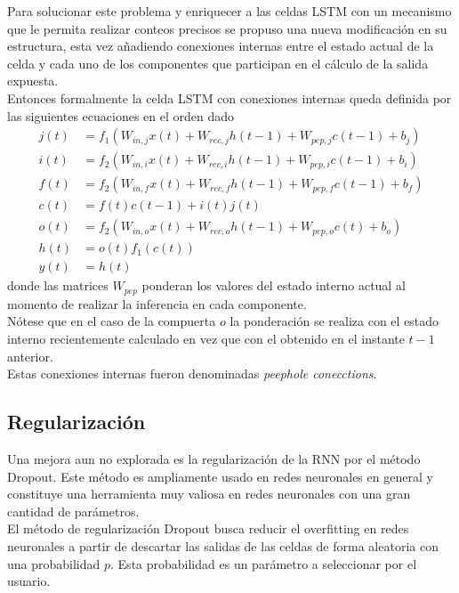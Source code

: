 \documentclass{article}
\begin{document}
	Para solucionar este problema y enriquecer a las celdas LSTM con un mecanismo que le permita realizar conteos precisos se propuso una nueva modificación en su estructura, esta vez añadiendo conexiones internas entre el estado actual de la celda y cada uno de los componentes que participan en el cálculo de la salida expuesta.\\
	Entonces formalmente la celda LSTM con conexiones internas queda definida por las siguientes ecuaciones en el orden dado
	\begin{equation*}
	\begin{split}
	j(t) &= f_1(W_{in, j} x(t) + W_{rec, j} h(t-1) + W_{pep, j} c(t-1) + b_{j})\\
	i(t) &= f_2(W_{in, i} x(t) + W_{rec, i} h(t-1) + W_{pep, i} c(t-1) + b_{i})\\
	f(t) &= f_2(W_{in, f} x(t) + W_{rec, f} h(t-1) + W_{pep, f} c(t-1) + b_f)\\
	c(t) &= f(t)c(t-1) + i(t)j(t)\\
	o(t) &= f_2(W_{in, o} x(t) + W_{rec, o} h(t-1) + W_{pep, o} c(t) + b_o)\\
	h(t) &= o(t)f_1(c(t))\\
	y(t) &= h(t)
	\end{split}
	\end{equation*}
	donde las matrices $W_{pep}$ ponderan los valores del estado interno actual al momento de realizar la inferencia en cada componente.\\
	Nótese que en el caso de la compuerta $o$ la ponderación se realiza con el estado interno recientemente calculado en vez que con el obtenido en el instante $t-1$ anterior.\\
	Estas conexiones internas fueron denominadas \textit{peephole conecctions}.
	
	\subsection{Regularización}
	Una mejora aun no explorada es la regularización de la RNN por el método Dropout. Este método es ampliamente usado en redes neuronales en general y constituye una herramienta muy valiosa en redes neuronales con una gran cantidad de parámetros.\\
	El método de regularización Dropout busca reducir el overfitting en redes neuronales a partir de descartar las salidas de las celdas de forma aleatoria con una probabilidad $p$. Esta probabilidad es un parámetro a seleccionar por el usuario.\\
	
\end{document}
